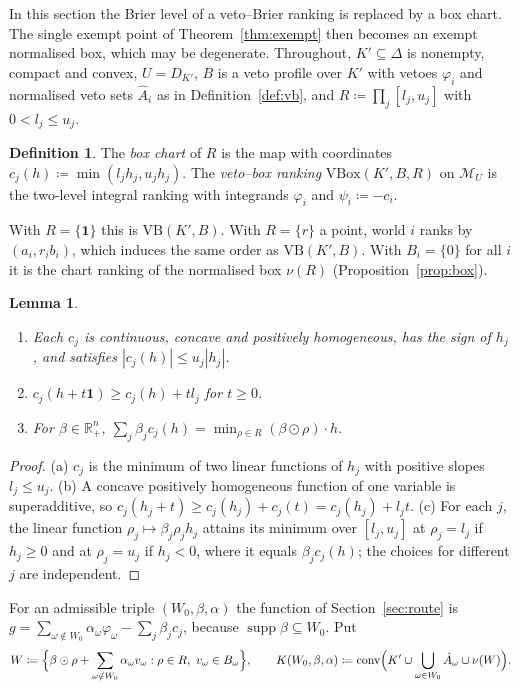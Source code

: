 \documentclass[11pt]{article}
\newcommand{\R}{\mathbb{R}}
\newcommand{\one}{\mathbf{1}}
\newcommand{\M}{\mathcal{M}}
\newcommand{\VB}{\mathrm{VB}}
\DeclareMathOperator{\conv}{conv}
\DeclareMathOperator{\supp}{supp}
\theoremstyle{plain}
\newtheorem{lemma}[theorem]{Lemma}
\theoremstyle{definition}
\newtheorem{definition}[theorem]{Definition}
\theoremstyle{remark}
\begin{document}
In this section the Brier level of a veto--Brier ranking is replaced by a box chart. The
single exempt point of Theorem~\ref{thm:exempt} then becomes an exempt normalised box,
which may be degenerate. Throughout, $K'\subseteq\Delta$ is nonempty, compact and convex,
$U=D_{K'}$, $B$ is a veto profile over $K'$ with vetoes $\varphi_i$ and normalised veto
sets $\hat A_i$ as in Definition~\ref{def:vb}, and $R\coloneqq\prod_j[l_j,u_j]$ with
$0<l_j\le u_j$.

\begin{definition}\label{def:vbox}
The \emph{box chart} of $R$ is the map with coordinates $c_j(h)\coloneqq\min(l_jh_j,
u_jh_j)$. The \emph{veto--box ranking} $\mathrm{VBox}(K',B,R)$ on $\M_U$ is the two-level
integral ranking with integrands $\varphi_i$ and $\psi_i\coloneqq-c_i$.
\end{definition}

With $R=\{\one\}$ this is $\VB(K',B)$. With $R=\{r\}$ a point, world $i$ ranks by
$(a_i,r_ib_i)$, which induces the same order as $\VB(K',B)$. With $B_i=\{0\}$ for all
$i$ it is the chart ranking of the normalised box $\nu(R)$ (Proposition~\ref{prop:box}).

\begin{lemma}\label{lem:boxchart}
\begin{enumerate}[label=(\alph*)]
  \item Each $c_j$ is continuous, concave and positively homogeneous, has the sign of
  $h_j$, and satisfies $|c_j(h)|\le u_j|h_j|$.
  \item $c_j(h+t\one)\ge c_j(h)+tl_j$ for $t\ge0$.
  \item For $\beta\in\R^n_+$, $\sum_j\beta_jc_j(h)=\min_{\rho\in R}(\beta\odot\rho)\cdot h$.
\end{enumerate}
\end{lemma}

\begin{proof}
(a) $c_j$ is the minimum of two linear functions of $h_j$ with positive slopes $l_j\le
u_j$. (b) A concave positively homogeneous function of one variable is superadditive, so
$c_j(h_j+t)\ge c_j(h_j)+c_j(t)=c_j(h_j)+l_jt$. (c) For each $j$, the linear function
$\rho_j\mapsto\beta_j\rho_jh_j$ attains its minimum over $[l_j,u_j]$ at $\rho_j=l_j$ if
$h_j\ge0$ and at $\rho_j=u_j$ if $h_j<0$, where it equals $\beta_jc_j(h)$; the choices for
different $j$ are independent.
\end{proof}

For an admissible triple $(W_0,\beta,\alpha)$ the function of Section~\ref{sec:route} is
$g=\sum_{\omega\notin W_0}\alpha_\omega\varphi_\omega-\sum_j\beta_jc_j$, because
$\supp\beta\subseteq W_0$. Put
\[
  W\coloneqq\Bigl\{\beta\odot\rho+\sum_{\omega\notin W_0}\alpha_\omega v_\omega:
  \rho\in R,\ v_\omega\in B_\omega\Bigr\},\qquad
  K(W_0,\beta,\alpha)\coloneqq\conv\Bigl(K'\cup\bigcup_{\omega\in W_0}\hat A_\omega\cup
  \nu(W)\Bigr).
\]
\end{document}
